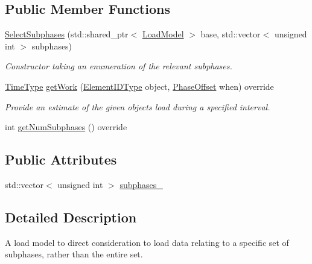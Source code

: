 \subsection*{Public Member Functions}
\begin{DoxyCompactItemize}
\item 
\hyperlink{classvt_1_1vrt_1_1collection_1_1balance_1_1_select_subphases_a6eeee8aa0dce1a0483549835006a0bed}{Select\+Subphases} (std\+::shared\+\_\+ptr$<$ \hyperlink{classvt_1_1vrt_1_1collection_1_1balance_1_1_load_model}{Load\+Model} $>$ base, std\+::vector$<$ unsigned int $>$ subphases)
\begin{DoxyCompactList}\small\item\em Constructor taking an enumeration of the relevant subphases. \end{DoxyCompactList}\item 
\hyperlink{namespacevt_a876a9d0cd5a952859c72de8a46881442}{Time\+Type} \hyperlink{classvt_1_1vrt_1_1collection_1_1balance_1_1_select_subphases_abca8bb1ca9edf950931d1bfd026c0474}{get\+Work} (\hyperlink{namespacevt_1_1vrt_1_1collection_1_1balance_a14c8d2c972f2913aa3f1636e5be0a120}{Element\+I\+D\+Type} object, \hyperlink{structvt_1_1vrt_1_1collection_1_1balance_1_1_phase_offset}{Phase\+Offset} when) override
\begin{DoxyCompactList}\small\item\em Provide an estimate of the given object\textquotesingle{}s load during a specified interval. \end{DoxyCompactList}\item 
int \hyperlink{classvt_1_1vrt_1_1collection_1_1balance_1_1_select_subphases_a347673e0bbc4ded04f32d97fea8f5b68}{get\+Num\+Subphases} () override
\end{DoxyCompactItemize}
\subsection*{Public Attributes}
\begin{DoxyCompactItemize}
\item 
std\+::vector$<$ unsigned int $>$ \hyperlink{classvt_1_1vrt_1_1collection_1_1balance_1_1_select_subphases_ad9ad62b67851546a4377ee6a4e17181e}{subphases\+\_\+}
\end{DoxyCompactItemize}


\subsection{Detailed Description}
A load model to direct consideration to load data relating to a specific set of subphases, rather than the entire set. 

